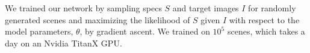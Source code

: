 \documentclass{article}
\newcommand{\probability}{\mathds{P}} %
\theoremstyle{definition}
\begin{document}
We trained our network by sampling specs $S$ and target
images $I$ for randomly generated scenes
and maximizing
 the likelihood of $S$ given $I$ with respect to
 the model parameters, $\theta$, by gradient ascent.
We trained on $10^5$ scenes, which takes a day on an Nvidia TitanX GPU.

\end{document}
